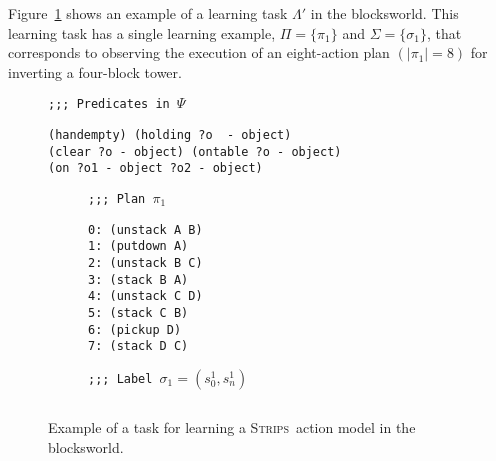 \documentclass[letterpaper]{article} %
\newcommand{\strips}{\textsc{Strips}}     %
\begin{document}
Figure~\ref{fig:lexample} shows an example of a learning task $\Lambda'$ in the blocksworld. This learning task has a single learning example, $\Pi=\{\pi_1\}$ and $\Sigma=\{\sigma_1\}$, that corresponds to observing the execution of an eight-action plan $(|\pi_1|=8)$ for inverting a four-block tower.

\begin{figure}
{\tt ;;; Predicates in $\Psi$}
\begin{footnotesize}
\begin{verbatim}
(handempty) (holding ?o  - object)
(clear ?o - object) (ontable ?o - object)
(on ?o1 - object ?o2 - object)
\end{verbatim}
\end{footnotesize}

\vspace{0.2cm}

\begin{subfigure}{.25\textwidth}
{\tt ;;; Plan $\pi_1$}
\begin{footnotesize}
\begin{verbatim}
0: (unstack A B)
1: (putdown A)
2: (unstack B C)
3: (stack B A)
4: (unstack C D)
5: (stack C B)
6: (pickup D)
7: (stack D C)
\end{verbatim}
\end{footnotesize}
\end{subfigure}%
\begin{subfigure}{.6\textwidth}
{\tt ;;; Label $\sigma_1=(s_0^1,s_{n}^1)$}
\begin{lstlisting}[mathescape]
\end{lstlisting}
\vspace{0.1cm}
\vspace{0.6cm}
\end{subfigure}%
 \caption{\small Example of a task for learning a \strips\ action model in the blocksworld.}
\label{fig:lexample}
\end{figure}
\end{document}
